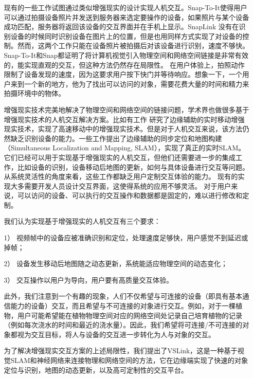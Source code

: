 现有的一些工作试图通过类似增强现实的设计实现人机交互\cite{de2016snap,chen2018snaplink}。Snap-To-It\cite{de2016snap}使得用户可以通过拍摄设备照片并发送到服务器来选定要操作的设备，如果照片与某个设备成功匹配，服务器将返回该设备的交互界面并在手机上显示。SnapLink\cite{chen2018snaplink} 没有在识别设备的时候同时识别设备在图片上的位置，但是也用同样方式实现了对设备的控制。然而，这两个工作只能在设备照片被拍摄后对该设备进行识别，速度不够快。Snap-To-It和Snap都证明了将计算机视觉引入物理空间和网络空间链接是非常有效的，能实现直观的交互，但这种方法仍然存在局限性。
在用户体验上，拍照动作限制了设备发现的速度，因为这要求用户按下快门并等待响应。想象一下，一个用户来到一个新的地方，他为了找出可以访问的对象，需要花费大量的时间和精力来拍摄环境中的物体。

增强现实技术完美地解决了物理空间和网络空间的链接问题，学术界也做很多基于增强现实技术的人机交互解决方案。比如有工作\cite{liu2019edge} 研究了边缘辅助的实时移动增强现实技术，实现了高速移动中的增强现实技术。但是对于人机交互来说，该方法仍然缺乏识别设备的能力。一些工作\cite{ben2020edge,xu2020edge,liu2021edgesharing}提出了边缘辅助的同步定位和地图构建（Simultaneous Localization and Mapping, SLAM），实现了真正的实时SLAM。它们已经可以用于实现基于增强现实的人机交互，但他们还需要进一步的集成工作，比如设备的识别，设备移动后地图的更新，如何与具体设备进行交互等问题。
从系统灵活性的角度来看，这些工作都缺乏用户定制交互体验的能力。
现有的实现大多需要开发人员设计交互界面，这使得系统的应用不够灵活。
对于用户来说，可以访问的设备、可以执行的交互操作和数据都是固定的，难以进行修改和定制。

我们认为实现基于增强现实的人机交互有三个要求：

1） 视频帧中的设备应被准确识别和定位，处理速度足够快，用户感觉不到延迟或掉帧；

2） 设备发生移动后地图随之动态更新，系统能适应物理空间的动态变化；

3） 交互操作以用户为导向，用户要有高质量交互体验。

此外，我们注意到一个有趣的现象，人们不仅希望与可连接的设备（即具有基本通信能力的设备）交互，而且希望与不可连接的对象进行交互。例如，对于一棵植物，用户可能希望能在植物物理空间对应的网络空间处记录自己培育植物的记录（例如每次浇水的时间和最近的浇水量）。因此，我们希望将可连接/不可连接的对象都视为交互目标，将人与设备的交互进一步转化为人与对象的交互。

为了解决增强现实交互方案的上述局限性，我们提出了VSLink，这是一种基于视觉SLAM和神经网络来连接物理和网络空间的方法，它在边缘端实现了快速的对象定位与识别，地图的动态更新，以及高可定制性的交互平台。

